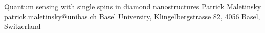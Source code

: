 \begin{conf-abstract}[]
{Quantum sensing with single spins in diamond nanostructures}
{\color{blue} Patrick Maletinsky}
{patrick.maletinsky@unibas.ch}
{Basel University, Klingelbergstrasse 82, 4056 Basel, Switzerland}
{\decofourleft \decofourright}





\printbibliography[heading=none]

\end{conf-abstract}
